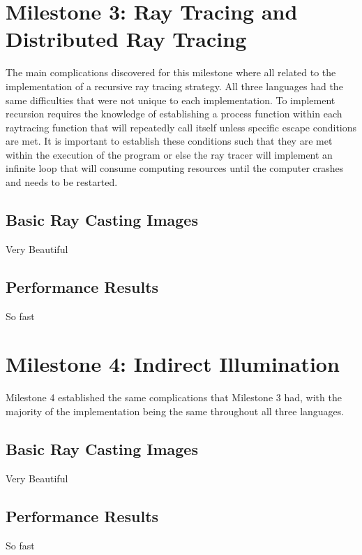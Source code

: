 \section{Milestone 3: Ray Tracing and Distributed Ray Tracing}
The main complications discovered for this milestone where all related to the implementation of a recursive ray tracing strategy.  All three languages had the same difficulties that were not unique to each implementation.  To implement recursion requires the knowledge of establishing a process function within each raytracing function that will repeatedly call itself unless specific escape conditions are met.  It is important to establish these conditions such that they are met within the execution of the program or else the ray tracer will implement an infinite loop that will consume computing resources until the computer crashes and needs to be restarted.  

\subsection{Basic Ray Casting Images}
Very Beautiful
\subsection{Performance Results}
So fast

\section{Milestone 4: Indirect Illumination}
Milestone 4 established the same complications that Milestone 3 had, with the majority of the implementation being the same throughout all three languages.
\subsection{Basic Ray Casting Images}
Very Beautiful
\subsection{Performance Results}
So fast
